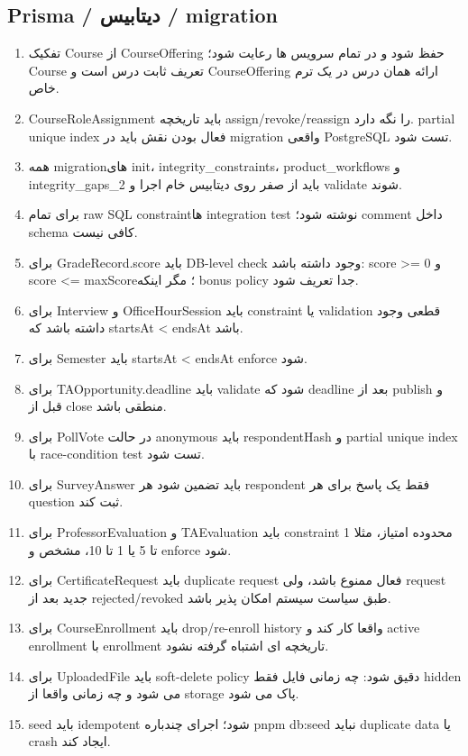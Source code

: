 \documentclass[11pt,a4paper]{article}
\begin{document}
\subsection{Prisma / دیتابیس / migration}
\begin{enumerate}[label=\arabic*. ,resume]
\item تفکیک Course از CourseOffering حفظ شود و در تمام سرویس ها رعایت شود؛ Course تعریف ثابت درس است و CourseOffering ارائه همان درس در یک ترم خاص.
\item CourseRoleAssignment باید تاریخچه assign/revoke/reassign را نگه دارد. partial unique index فعال بودن نقش باید در migration واقعی PostgreSQL تست شود.
\item همه migrationهای init، integrity\_constraints، product\_workflows و integrity\_gaps\_2 باید از صفر روی دیتابیس خام اجرا و validate شوند.
\item برای تمام raw SQL constraintها integration test نوشته شود؛ comment داخل schema کافی نیست.
\item برای GradeRecord.score باید DB-level check وجود داشته باشد: score >= 0 و score <= maxScore؛ مگر اینکه bonus policy جدا تعریف شود.
\item برای Interview و OfficeHourSession باید constraint یا validation قطعی وجود داشته باشد که startsAt < endsAt باشد.
\item برای Semester باید startsAt < endsAt enforce شود.
\item برای TAOpportunity.deadline باید validate شود که deadline بعد از publish و قبل از close منطقی باشد.
\item برای PollVote در حالت anonymous باید respondentHash و partial unique index با race-condition test تست شود.
\item برای SurveyAnswer باید تضمین شود هر respondent فقط یک پاسخ برای هر question ثبت کند.
\item برای ProfessorEvaluation و TAEvaluation باید constraint محدوده امتیاز، مثلا 1 تا 5 یا 1 تا 10، مشخص و enforce شود.
\item برای CertificateRequest باید duplicate request فعال ممنوع باشد، ولی request جدید بعد از rejected/revoked طبق سیاست سیستم امکان پذیر باشد.
\item برای CourseEnrollment باید drop/re-enroll history واقعا کار کند و active enrollment با enrollment تاریخچه ای اشتباه گرفته نشود.
\item برای UploadedFile باید soft-delete policy دقیق شود: چه زمانی فایل فقط hidden می شود و چه زمانی واقعا از storage پاک می شود.
\item seed باید idempotent شود؛ اجرای چندباره pnpm db:seed نباید duplicate data یا crash ایجاد کند.
\end{enumerate}
\end{document}
